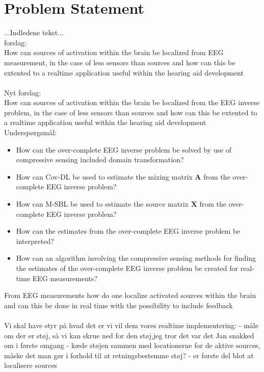 \chapter{Problem Statement}
...Indledene tekst...\\ 

forslag:\\
How can sources of activation within the brain be localized from EEG measurement, in the case of less sensors than sources and how can this be extented to a realtime application useful within the hearing aid development\\
\\
Nyt forslag: \\
How can sources of activation within the brain be localized from the EEG inverse problem, in the case of less sensors than sources and how can this be extented to a realtime application useful within the hearing aid development
\\

Underspørgsmål:\\
\begin{itemize}
\item How can the over-complete EEG inverse problem be solved by use of compressive sensing included domain transformation?
\item How can Cov-DL be used to estimate the mixing matrix $\mathbf{A}$ from the over-complete EEG inverse problem?
\item How can M-SBL be used to estimate the source matrix $\mathbf{X}$ from the over-complete EEG inverse problem?
\item How can the estimates from the over-complete EEG inverse problem be interpreted?
\item How can an algorithm involving the compressive sensing methods for finding the estimates of the over-complete EEG inverse problem be created for real-time EEG measurements?
\end{itemize}





From EEG measurements how do one localize activated sources within the brain and can this be done in real time with the possibility to include feedback 
\\ \\



Vi skal have styr på hvad det er vi vil dem vores realtime implementering: 
- måle om der er støj, så vi kan skrue ned for den støj,jeg tror det var det Jan snakked om i første omgang 
- kæde støjen sammen med locationerne for de aktive sources, måske det man gør i forhold til at retningsbestemme støj? 
- er første del blot at localisere sources  

 